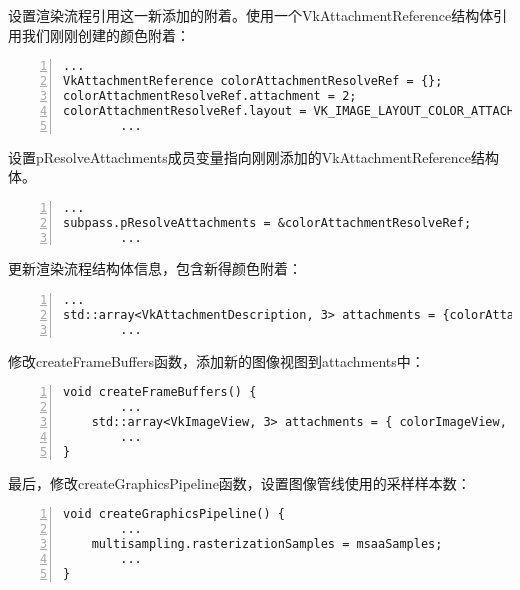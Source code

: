 \documentclass{ctexart}
\begin{document}
设置渲染流程引用这一新添加的附着。使用一个VkAttachmentReference结构体引用我们刚刚创建的颜色附着：

\begin{lstlisting}[language={[ANSI]C},keywordstyle=\color{blue!70},commentstyle=\color{red!50!green!50!blue!50},frame=shadowbox, rulesepcolor=\color{red!20!green!20!blue!20},basicstyle=\small,numbers=left, numberstyle=\tiny,breaklines=true]
		...
VkAttachmentReference colorAttachmentResolveRef = {};
colorAttachmentResolveRef.attachment = 2;
colorAttachmentResolveRef.layout = VK_IMAGE_LAYOUT_COLOR_ATTACHMENT_OPTIMAL;
		...
\end{lstlisting}

设置pResolveAttachments成员变量指向刚刚添加的VkAttachmentReference结构体。

\begin{lstlisting}[language={[ANSI]C},keywordstyle=\color{blue!70},commentstyle=\color{red!50!green!50!blue!50},frame=shadowbox, rulesepcolor=\color{red!20!green!20!blue!20},basicstyle=\small,numbers=left, numberstyle=\tiny,breaklines=true]
		...
subpass.pResolveAttachments = &colorAttachmentResolveRef;
		...
\end{lstlisting}

更新渲染流程结构体信息，包含新得颜色附着：

\begin{lstlisting}[language={[ANSI]C},keywordstyle=\color{blue!70},commentstyle=\color{red!50!green!50!blue!50},frame=shadowbox, rulesepcolor=\color{red!20!green!20!blue!20},basicstyle=\small,numbers=left, numberstyle=\tiny,breaklines=true]
		...
std::array<VkAttachmentDescription, 3> attachments = {colorAttachment, depthAttachment, colorAttachmentResolve};
		...
\end{lstlisting}

修改createFrameBuffers函数，添加新的图像视图到attachments中：

\begin{lstlisting}[language={[ANSI]C},keywordstyle=\color{blue!70},commentstyle=\color{red!50!green!50!blue!50},frame=shadowbox, rulesepcolor=\color{red!20!green!20!blue!20},basicstyle=\small,numbers=left, numberstyle=\tiny,breaklines=true]
void createFrameBuffers() {
		...
	std::array<VkImageView, 3> attachments = { colorImageView, depthImageView, swapChainImageViews[i]};
		...
}
\end{lstlisting}

最后，修改createGraphicsPipeline函数，设置图像管线使用的采样样本数：

\begin{lstlisting}[language={[ANSI]C},keywordstyle=\color{blue!70},commentstyle=\color{red!50!green!50!blue!50},frame=shadowbox, rulesepcolor=\color{red!20!green!20!blue!20},basicstyle=\small,numbers=left, numberstyle=\tiny,breaklines=true]
void createGraphicsPipeline() {
		...
	multisampling.rasterizationSamples = msaaSamples;
		...
}
\end{lstlisting}
\end{document}

